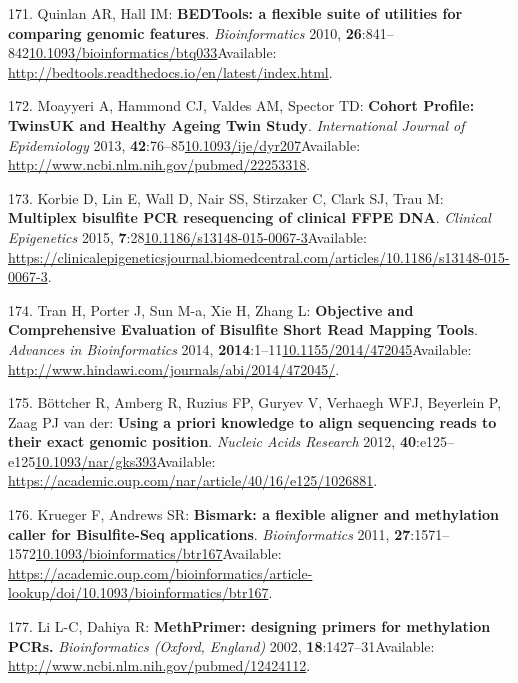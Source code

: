 \documentclass[
]{book}
\begin{document}
\leavevmode\hypertarget{ref-Quinlan2010}{}%
171. Quinlan AR, Hall IM: \textbf{BEDTools: a flexible suite of utilities for comparing genomic features}. \emph{Bioinformatics} 2010, \textbf{26}:841--842\href{https://doi.org/10.1093/bioinformatics/btq033}{10.1093/bioinformatics/btq033}Available: \url{http://bedtools.readthedocs.io/en/latest/index.html}.

\leavevmode\hypertarget{ref-Moayyeri2013}{}%
172. Moayyeri A, Hammond CJ, Valdes AM, Spector TD: \textbf{Cohort Profile: TwinsUK and Healthy Ageing Twin Study}. \emph{International Journal of Epidemiology} 2013, \textbf{42}:76--85\href{https://doi.org/10.1093/ije/dyr207}{10.1093/ije/dyr207}Available: \url{http://www.ncbi.nlm.nih.gov/pubmed/22253318}.

\leavevmode\hypertarget{ref-Korbie2015}{}%
173. Korbie D, Lin E, Wall D, Nair SS, Stirzaker C, Clark SJ, Trau M: \textbf{Multiplex bisulfite PCR resequencing of clinical FFPE DNA}. \emph{Clinical Epigenetics} 2015, \textbf{7}:28\href{https://doi.org/10.1186/s13148-015-0067-3}{10.1186/s13148-015-0067-3}Available: \url{https://clinicalepigeneticsjournal.biomedcentral.com/articles/10.1186/s13148-015-0067-3}.

\leavevmode\hypertarget{ref-Tran2014}{}%
174. Tran H, Porter J, Sun M-a, Xie H, Zhang L: \textbf{Objective and Comprehensive Evaluation of Bisulfite Short Read Mapping Tools}. \emph{Advances in Bioinformatics} 2014, \textbf{2014}:1--11\href{https://doi.org/10.1155/2014/472045}{10.1155/2014/472045}Available: \url{http://www.hindawi.com/journals/abi/2014/472045/}.

\leavevmode\hypertarget{ref-Bottcher2012}{}%
175. Böttcher R, Amberg R, Ruzius FP, Guryev V, Verhaegh WFJ, Beyerlein P, Zaag PJ van der: \textbf{Using a priori knowledge to align sequencing reads to their exact genomic position}. \emph{Nucleic Acids Research} 2012, \textbf{40}:e125--e125\href{https://doi.org/10.1093/nar/gks393}{10.1093/nar/gks393}Available: \url{https://academic.oup.com/nar/article/40/16/e125/1026881}.

\leavevmode\hypertarget{ref-Krueger2011}{}%
176. Krueger F, Andrews SR: \textbf{Bismark: a flexible aligner and methylation caller for Bisulfite-Seq applications}. \emph{Bioinformatics} 2011, \textbf{27}:1571--1572\href{https://doi.org/10.1093/bioinformatics/btr167}{10.1093/bioinformatics/btr167}Available: \url{https://academic.oup.com/bioinformatics/article-lookup/doi/10.1093/bioinformatics/btr167}.

\leavevmode\hypertarget{ref-Li2002}{}%
177. Li L-C, Dahiya R: \textbf{MethPrimer: designing primers for methylation PCRs.} \emph{Bioinformatics (Oxford, England)} 2002, \textbf{18}:1427--31Available: \url{http://www.ncbi.nlm.nih.gov/pubmed/12424112}.
\end{document}
